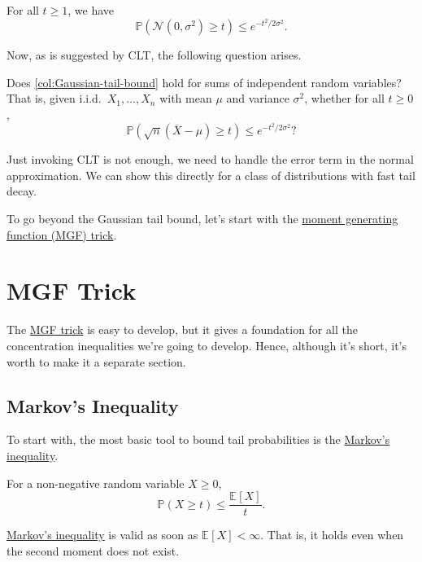 \begin{corollary}\label{col:Gaussian-tail-bound}
	For all \(t \geq 1\), we have
	\[
		\mathbb{P} (\mathcal{N} (0, \sigma ^{2} ) \geq t) \leq e^{-t^2 / 2\sigma ^{2} }.
	\]
\end{corollary}

Now, as is suggested by CLT, the following question arises.

\begin{problem*}
	Does \autoref{col:Gaussian-tail-bound} hold for sums of independent random variables? That is, given i.i.d.\ \(X_1, \dots , X_n\) with mean \(\mu \) and variance \(\sigma ^{2} \), whether for all \(t \geq 0\),
	\[
		\mathbb{P} (\sqrt{n}(\overline{X} - \mu ) \geq t )\leq e^{-t^2 / 2 \sigma ^{2} }?
	\]
\end{problem*}
\begin{answer}
	Just invoking CLT is not enough, we need to handle the error term in the normal approximation. We can show this directly for a class of distributions with fast tail decay.
\end{answer}

To go beyond the Gaussian tail bound, let's start with the \hyperref[lma:MGF-trick]{moment generating function (MGF) trick}.

\section{MGF Trick}
The \hyperref[lma:MGF-trick]{MGF trick} is easy to develop, but it gives a foundation for all the concentration inequalities we're going to develop. Hence, although it's short, it's worth to make it a separate section.

\subsection{Markov's Inequality}
To start with, the most basic tool to bound tail probabilities is the \hyperref[lma:Markov-inequality]{Markov's inequality}.

\begin{lemma}\label{lma:Markov-inequality}
	For a non-negative random variable \(X \geq 0\),
	\[
		\mathbb{P} (X \geq t) \leq \frac{\mathbb{E}_{}\left[X \right] }{t}.
	\]
\end{lemma}

\begin{note}
	\hyperref[lma:Markov-inequality]{Markov's inequality} is valid as soon as \(\mathbb{E}_{}\left[X \right] < \infty \). That is, it holds even when the second moment does not exist.
\end{note}

